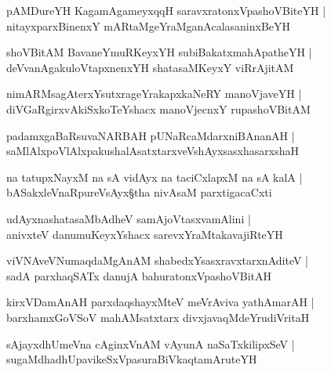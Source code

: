 \begin{shloka}
pAMDureYH KagamAgameyxqqH saravxratonxVpashoVBiteYH |\\
nitayxparxBinenxY mARtaMgeYraMganAcalasaninxBeYH
\end{shloka}

\begin{shloka}
shoVBitAM BavaneYmuRKeyxYH subiBakatxmahApatheYH |\\
deVvanAgakuloVtapxnenxYH shatasaMKeyxY viRrAjitAM
\end{shloka}

\begin{shloka}
nimARMsagAterxYsutxrageYrakapxkaNeRY manoVjaveYH |\\
diVGaRgirxvAkiSxkoTeYshacx manoVjecnxY rupashoVBitAM
\end{shloka}

\begin{shloka}
padamxgaBaRsuvaNARBAH pUNaRcaMdarxniBAnanAH |\\
saMlAlxpoVlAlxpakushalAsatxtarxveVshAyxsasxhasarxshaH
\end{shloka}

\begin{shloka}
na tatupxNayxM na sA vidAyx na taciCxlapxM na sA kalA |\\
bASakxleVnaRpureVsAyx\S tha nivAsaM parxtigacaCxti
\end{shloka}

\begin{shloka}
udAyxnashatasaMbAdheV samAjoVtasxvamAlini |\\
anivxteV danumuKeyxYshacx sarevxYraMtakavajiRteYH
\end{shloka}

\begin{shloka}
viVNAveVNumaqdaMgAnAM shabedxYsasxravxtarxnAditeV |\\
sadA parxhaqSATx danujA bahuratonxVpashoVBitAH
\end{shloka}

\begin{shloka}
kirxVDamAnAH parxdaqshayxMteV meVrAviva yathAmarAH |\\
barxhamxGoVSoV mahAMsatxtarx divxjavaqMdeYrudiVritaH 
\end{shloka}

\begin{shloka}
sAjayxdhUmeVna cAginxVnAM vAyunA naSaTxkilipxSeV |\\
sugaMdhadhUpavikeSxVpasuraBiVkaqtamAruteYH
\end{shloka}

